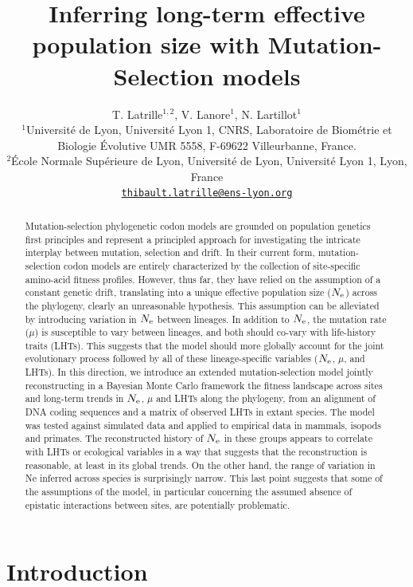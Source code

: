 \documentclass{article}
\title{Inferring long-term effective population size with Mutation-Selection models}
\author{
    \large
    T. {Latrille}$^{1,2}$, V. {Lanore}$^{1}$, N. {Lartillot}$^{1}$ \\
    \normalsize
	$^{1}$Université de Lyon, Université Lyon 1, CNRS, Laboratoire de Biométrie et Biologie Évolutive UMR 5558, F-69622 Villeurbanne, France.\\
	$^{2}$École Normale Supérieure de Lyon, Université de Lyon, Université Lyon 1, Lyon, France\\
	\texttt{\href{mailto:thibault.latrille@ens-lyon.org}{thibault.latrille@ens-lyon.org}} \\
}
\begin{document}
\maketitle

\begin{abstract}
    Mutation-selection phylogenetic codon models are grounded on population genetics first principles and represent a principled approach for investigating the intricate interplay between mutation, selection and drift.
    In their current form, mutation-selection codon models are entirely characterized by the collection of site-specific amino-acid fitness profiles.
    However, thus far, they have relied on the assumption of a constant genetic drift, translating into a unique effective population size ($N_{\text{e}}$) across the phylogeny, clearly an unreasonable hypothesis.
    This assumption can be alleviated by introducing variation in $N_{\text{e}}$ between lineages.
    In addition to $N_{\text{e}}$, the mutation rate ($\mu$) is susceptible to vary between lineages, and both should co-vary with life-history traits (LHTs).
    This suggests that the model should more globally account for the joint evolutionary process followed by all of these lineage-specific variables ($N_{\text{e}}$, $\mu$, and LHTs).
    In this direction, we introduce an extended mutation-selection model jointly reconstructing in a Bayesian Monte Carlo framework the fitness landscape across sites and long-term trends in $N_{\text{e}}$, $\mu$ and LHTs along the phylogeny, from an alignment of DNA coding sequences and a matrix of observed LHTs in extant species.
    The model was tested against simulated data and applied to empirical data in mammals, isopods and primates.
    The reconstructed history of $N_{\text{e}}$ in these groups appears to correlate with LHTs or ecological variables in a way that suggests that the reconstruction is reasonable, at least in its global trends.
    On the other hand, the range of variation in Ne inferred across species is surprisingly narrow.
    This last point suggests that some of the assumptions of the model, in particular concerning the assumed absence of epistatic interactions between sites, are potentially problematic.

\end{abstract}


\section{Introduction}
\label{sec:Introduction}
\end{document}
